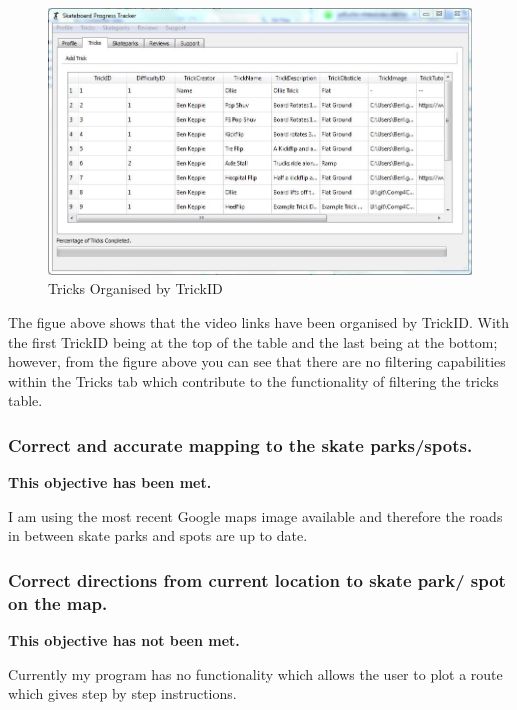 \begin{figure}[H]
    \includegraphics[width=\textwidth]{./Evaluation/images/OrganisedTricks.jpg}
    \caption{Tricks Organised by TrickID} \label{fig:TricksOrganised}
\end{figure}

The figue above shows that the video links have been organised by TrickID. With the first TrickID being at the top of the table and the last being at the bottom; however, from the figure above you can see that there are no filtering capabilities within the Tricks tab which contribute to the functionality of filtering the tricks table.




\subsubsection{Correct and accurate mapping to the skate parks/spots.}

\textbf{This objective has been met.}

I am using the most recent Google maps image available and therefore the roads in between skate parks and spots are up to date.



\subsubsection {Correct directions from current location to skate park/ spot on the map.}

\textbf{This objective has not been met.}

Currently my program has no functionality which allows the user to plot a route which gives step by step instructions.




